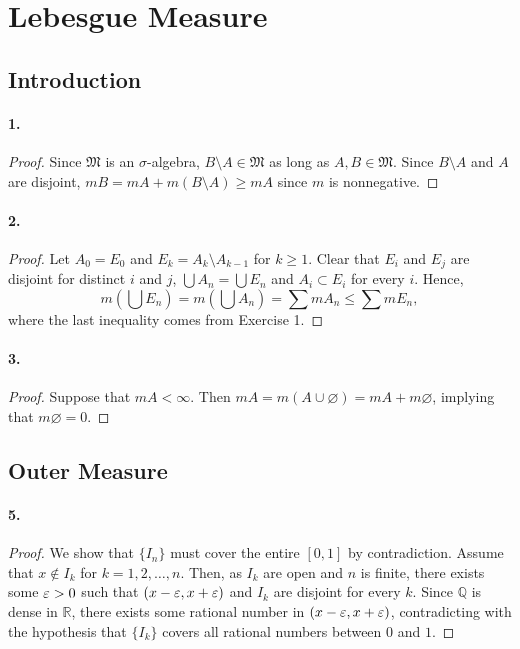 \section{Lebesgue Measure}
\subsection{Introduction}
  \paragraph{1.}
  \begin{proof}
    Since $\mathfrak{M}$ is an $\sigma$-algebra, $B\setminus A \in\mathfrak{M}$
    as long as $A,B\in\mathfrak{M}$. Since $B\setminus A$ and $A$ are disjoint,
    $mB=mA+m(B\setminus A)\ge mA$ since $m$ is nonnegative.
  \end{proof}

  \paragraph{2.}
  \begin{proof}
    Let $A_0 = E_0$ and $E_k=A_k\setminus A_{k-1}$ for $k\ge 1$. Clear that 
    $E_i$ and $E_j$ are disjoint for distinct $i$ and $j$, $\bigcup A_n=\bigcup
    E_n$ and $A_i\subset E_i$ for every $i$. Hence,
    \[
      m\left(\bigcup E_n\right) = m\left(\bigcup A_n\right)
      = \sum mA_n \le \sum mE_n,
    \]
    where the last inequality comes from Exercise 1.
  \end{proof}

  \paragraph{3.}
  \begin{proof}
    Suppose that $mA<\infty$. Then $mA=m(A\cup\varnothing)=mA+m\varnothing$, 
    implying that $m\varnothing=0$.
  \end{proof}

\subsection{Outer Measure}
  \paragraph{5.}
  \begin{proof}
    We show that $\{I_n\}$ must cover the entire $[0,1]$ by contradiction. 
    Assume that $x\notin I_k$ for $k=1,2,\dots,n$. Then, as $I_k$ are open and 
    $n$ is finite, there exists some $\varepsilon>0$ such that $(x-\varepsilon,x+\varepsilon)$ and 
    $I_k$ are disjoint for every $k$. Since $\mathbb{Q}$ is dense in 
    $\mathbb{R}$, there exists some rational number in $(x-\varepsilon, x+\varepsilon)$, 
    contradicting with the hypothesis that $\{I_k\}$ covers all rational numbers
    between $0$ and $1$.
  \end{proof}

